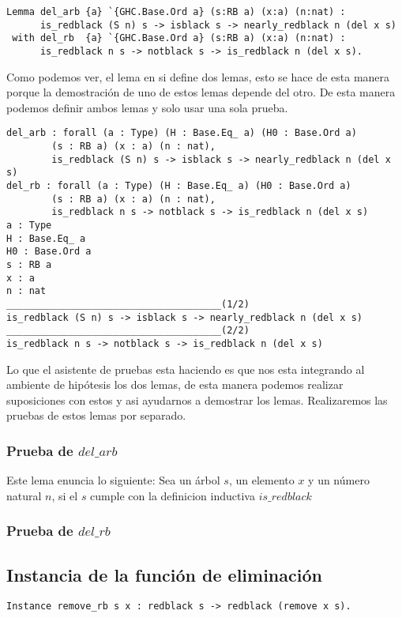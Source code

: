 \begin{verbatim}
Lemma del_arb {a} `{GHC.Base.Ord a} (s:RB a) (x:a) (n:nat) :
      is_redblack (S n) s -> isblack s -> nearly_redblack n (del x s)
 with del_rb  {a} `{GHC.Base.Ord a} (s:RB a) (x:a) (n:nat) :
      is_redblack n s -> notblack s -> is_redblack n (del x s).
\end{verbatim}

Como podemos ver, el lema en si define dos lemas, esto se hace de esta manera porque la
demostraci\'on de uno de estos lemas depende del otro. De esta manera podemos definir ambos lemas y
solo usar una sola prueba.

\begin{verbatim}
del_arb : forall (a : Type) (H : Base.Eq_ a) (H0 : Base.Ord a)
        (s : RB a) (x : a) (n : nat),
        is_redblack (S n) s -> isblack s -> nearly_redblack n (del x s)
del_rb : forall (a : Type) (H : Base.Eq_ a) (H0 : Base.Ord a)
        (s : RB a) (x : a) (n : nat),
        is_redblack n s -> notblack s -> is_redblack n (del x s)
a : Type
H : Base.Eq_ a
H0 : Base.Ord a
s : RB a
x : a
n : nat
______________________________________(1/2)
is_redblack (S n) s -> isblack s -> nearly_redblack n (del x s)
______________________________________(2/2)
is_redblack n s -> notblack s -> is_redblack n (del x s)
\end{verbatim}

Lo que el asistente de pruebas esta haciendo es que nos esta integrando al ambiente de hip\'otesis
los dos lemas, de esta manera podemos realizar suposiciones con estos y asi ayudarnos a demostrar
los lemas. Realizaremos las pruebas de estos lemas por separado.

\subsubsection{Prueba de $del\_arb$}
Este lema enuncia lo siguiente: Sea un \'arbol $s$, un elemento $x$ y un n\'umero natural $n$, si
el $s$ cumple con la definicion inductiva $is\_redblack$
\subsubsection{Prueba de $del\_rb$}

\subsection{Instancia de la funci\'on de eliminaci\'on}
\begin{verbatim}
Instance remove_rb s x : redblack s -> redblack (remove x s).
\end{verbatim}
